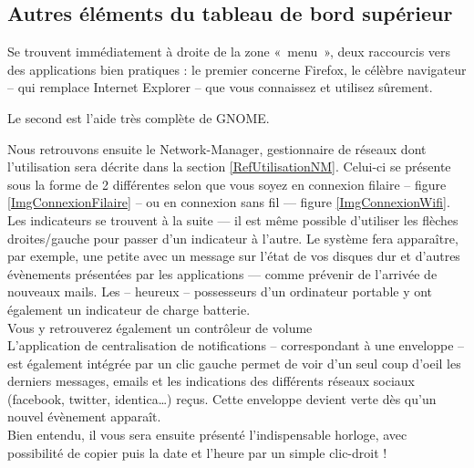 \subsection{Autres éléments du tableau de bord supérieur}
\IconeBarreHaut
Se trouvent immédiatement à droite de la zone «~menu~», deux raccourcis vers des applications bien pratiques : le premier concerne Firefox, le célèbre navigateur  -- qui remplace Internet Explorer -- que vous connaissez et utilisez sûrement.\par
Le second est l'aide très complète de GNOME.\par
Nous retrouvons ensuite le Network-Manager, gestionnaire de réseaux dont l'utilisation sera décrite dans la section \ref{RefUtilisationNM}. Celui-ci se présente sous la forme de 2  différentes selon que vous soyez en connexion filaire -- figure \ref{ImgConnexionFilaire} -- ou en connexion sans fil --- figure \ref{ImgConnexionWifi}.\\
Les indicateurs se trouvent à la suite --- il est même possible d'utiliser les flèches droites/gauche pour passer d'un indicateur à l'autre. Le système fera apparaître, par exemple, une petite  avec un message sur l'état de vos disques dur et d'autres évènements présentées par les applications --- comme prévenir de l'arrivée de nouveaux mails. Les -- heureux -- possesseurs d'un ordinateur portable y ont également un indicateur de charge batterie.\\
Vous y retrouverez également un contrôleur de volume\\
L'application de centralisation de notifications -- correspondant à une enveloppe -- est également intégrée par un clic gauche permet de voir d'un seul coup d'oeil les derniers messages, emails et les indications des différents réseaux sociaux (facebook, twitter, identica\dots{}) reçus. Cette enveloppe devient verte dès qu'un nouvel évènement apparaît.\\
Bien entendu, il vous sera ensuite présenté l'indispensable horloge, avec possibilité de copier puis la date et l'heure par un simple clic-droit !
